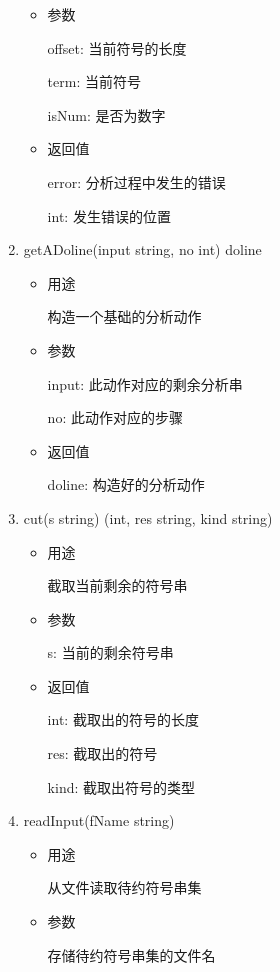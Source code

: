 \documentclass[fontset=none,UTF8,a4paper,zihao=-4]{ctexart}
\begin{document}
\begin{enumerate}
\begin{itemize}
\item 参数

offset: 当前符号的长度

term: 当前符号

isNum: 是否为数字

\item 返回值

error: 分析过程中发生的错误

int:   发生错误的位置
\end{itemize}

\item getADoline(input string, no int) doline

\begin{itemize}
\item 用途

构造一个基础的分析动作

\item 参数

input: 此动作对应的剩余分析串

no:    此动作对应的步骤

\item 返回值

doline: 构造好的分析动作
\end{itemize}

\item cut(s string) (int, res string, kind string)

\begin{itemize}
\item 用途

截取当前剩余的符号串

\item 参数

s: 当前的剩余符号串

\item 返回值

int:  截取出的符号的长度

res:  截取出的符号

kind: 截取出符号的类型
\end{itemize}

\item readInput(fName string)

\begin{itemize}
\item 用途

从文件读取待约符号串集

\item 参数

存储待约符号串集的文件名
\end{itemize}


\end{enumerate}
\end{document}
